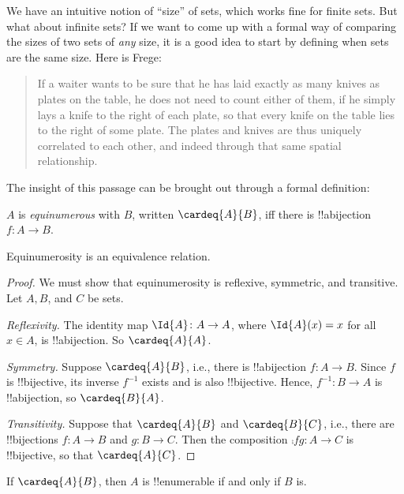 \documentclass[../../../include/open-logic-section]{subfiles}
\begin{document}

We have an intuitive notion of ``size'' of sets, which works fine for
finite sets. But what about infinite sets? If we want to come up with
a formal way of comparing the sizes of two sets of \emph{any} size, it
is a good idea to start by defining when sets are the same size. Here
is Frege:
\begin{quote}
  If a waiter wants to be sure that he has laid exactly as many knives
  as plates on the table, he does not need to count either of them, if
  he simply lays a knife to the right of each plate, so that every
  knife on the table lies to the right of some plate. The plates and
  knives are thus uniquely correlated to each other, and indeed
  through that same spatial relationship. \cite[\S70]{Frege1884}
\end{quote}
The insight of this passage can be brought out through a formal
definition:

\begin{defn}
  $A$ is \emph{equinumerous} with $B$, written $\cardeq{A}{B}$, iff
  there is !!a{bijection} $f \colon A \to B$. 
\end{defn}

\begin{prop}
Equinumerosity is an equivalence relation.
\end{prop}

\begin{proof} 
We must show that equinumerosity is reflexive, symmetric, and
transitive. Let $A, B$, and $C$ be sets.

\emph{Reflexivity.} The identity map $\Id{A} \colon A \to A$, where
$\Id{A} (x) = x$ for all $x \in A$, is !!a{bijection}. So
$\cardeq{A}{A}$.

\emph{Symmetry.} Suppose $\cardeq{A}{B}$, i.e., there is
!!a{bijection} $f\colon A \to B$. Since $f$ is !!{bijective}, its
inverse $f^{-1}$ exists and is also !!{bijective}. Hence,
$f^{-1}\colon B \to A$ is !!a{bijection}, so $\cardeq{B}{A}$.

\emph{Transitivity.} Suppose that $\cardeq{A}{B}$ and $\cardeq{B}{C}$,
i.e., there are !!{bijection}s $f\colon A \to B$ and $g\colon B \to
C$. Then the composition $\comp{f}{g}\colon A \to C$ is !!{bijective},
so that $\cardeq{A}{C}$.
\end{proof}

\begin{prop}
If $\cardeq{A}{B}$, then $A$ is !!{enumerable} if
and only if $B$ is.
\end{prop}
\end{document}
